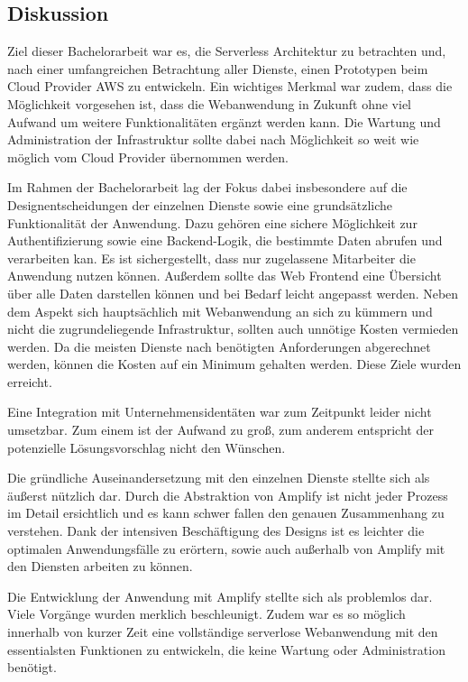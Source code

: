 \subsection{Diskussion}

Ziel dieser Bachelorarbeit war es, die Serverless Architektur zu betrachten und, nach einer umfangreichen Betrachtung aller Dienste, einen Prototypen beim Cloud Provider AWS zu entwickeln.
Ein wichtiges Merkmal war zudem, dass die Möglichkeit vorgesehen ist, dass die Webanwendung in Zukunft ohne viel Aufwand um weitere Funktionalitäten ergänzt werden kann.
Die Wartung und Administration der Infrastruktur sollte dabei nach Möglichkeit so weit wie möglich vom Cloud Provider übernommen werden.

Im Rahmen der Bachelorarbeit lag der Fokus dabei insbesondere auf die Designentscheidungen der einzelnen Dienste sowie eine grundsätzliche Funktionalität der Anwendung.
Dazu gehören eine sichere Möglichkeit zur Authentifizierung sowie eine Backend-Logik, die bestimmte Daten abrufen und verarbeiten kan.
Es ist sichergestellt, dass nur zugelassene Mitarbeiter die Anwendung nutzen können.
Außerdem sollte das Web Frontend eine Übersicht über alle Daten darstellen können und bei Bedarf leicht angepasst werden.
Neben dem Aspekt sich hauptsächlich mit Webanwendung an sich zu kümmern und nicht die zugrundeliegende Infrastruktur, sollten auch unnötige Kosten vermieden werden.
Da die meisten Dienste nach benötigten Anforderungen abgerechnet werden, können die Kosten auf ein Minimum gehalten werden.
Diese Ziele wurden erreicht.


Eine Integration mit Unternehmensidentäten war zum Zeitpunkt leider nicht umsetzbar.
Zum einem ist der Aufwand zu groß, zum anderem entspricht der potenzielle Lösungsvorschlag nicht den Wünschen.

Die gründliche Auseinandersetzung mit den einzelnen Dienste stellte sich als äußerst nützlich dar.
Durch die Abstraktion von Amplify ist nicht jeder Prozess im Detail ersichtlich und es kann schwer fallen den genauen Zusammenhang zu verstehen.
Dank der intensiven Beschäftigung des Designs ist es leichter die optimalen Anwendungsfälle zu erörtern, sowie auch außerhalb von Amplify mit den Diensten arbeiten zu können.

Die Entwicklung der Anwendung mit Amplify stellte sich als problemlos dar.
Viele Vorgänge wurden merklich beschleunigt.
Zudem war es so möglich innerhalb von kurzer Zeit eine vollständige serverlose Webanwendung mit den essentialsten Funktionen zu entwickeln, die keine Wartung oder Administration benötigt.


